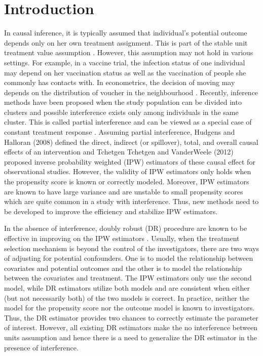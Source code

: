 \documentclass[oupdraft]{biostatistics}
\begin{document}
\newpage
\section{Introduction}
\vspace{-0.2cm}
In causal inference, it is typically assumed that individual's potential outcome depends only on her own treatment assignment. This is part of the stable unit treatment value assumption \citep{rubin1980randomization}. However, this assumption may not hold in various settings. For example, in a vaccine trial, the infection status of one individual may depend on her vaccination status as well as the vaccination of people she commonly has contacts with. In econometrics, the decision of moving may depends on the distribution of voucher in the neighbourhood \citep{sobel2006randomized}. Recently, inference methods have been proposed when the study population can be divided into clusters and possible interference exists only among individuals in the same cluster. This is called partial interference \citep{sobel2006randomized} and can be viewed as a special case of constant treatment response \citep{manski2013identification}. Assuming partial interference, Hudgens and Halloran (2008) defined the direct, indirect
(or spillover), total, and overall causal effects of an intervention and Tchetgen Tchetgen and VanderWeele (2012) proposed inverse probability weighted (IPW) estimators of these causal effect for observational studies. However, the validity of IPW estimators only holds when the propensity score is known or correctly modeled. Moreover, IPW estimators are known to have large variance and are unstable to small propensity scores which are quite common in a study with interference. Thus, new methods need to be developed to improve the efficiency and stabilize IPW estimators.


In the absence of interference, doubly robust (DR) procedure are known to be effective in improving on the IPW estimators \citep{lunceford2004stratification}. Usually, when the treatment selection mechanism is beyond the control of the investigators, there are two ways of adjusting for potential confounders. One is to model the relationship between covariates and potential outcomes and the other is to model the relationship between the covariates and treatment. The IPW estimators only use the second model, while DR estimators utilize both models and are consistent when either (but not necessarily both) of the two models is correct. In practice, neither the model for the propensity score nor the outcome model is known to investigators. Thus, the DR estimator provides two chances to correctly estimate the parameter of interest. However, all existing DR estimators make the no interference between units assumption and hence there is a need to generalize the DR estimator in the presence of interference.
\end{document}
